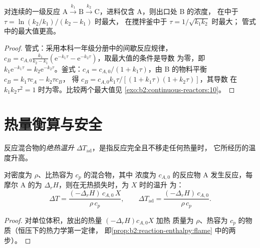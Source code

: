 \begin{proposition}[釜与管中的中间体]\label{prop:b2:continuous-reactors:consecutive}
对连续的一级反应 $\mathrm A \xrightarrow{k_1} \mathrm B
\xrightarrow{k_2} \mathrm C$，进料仅含 A，则出口处 B 的浓度，
在中于 $\tau = \ln(k_2/k_1)/(k_2 - k_1)$ 时最大，
在搅拌釜中于 $\tau = 1/\sqrt{k_1k_2}$ 时最大；
管式中的最大值更高。
\end{proposition}

\begin{proof}
管式：采用本科一年级分册中的间歇反应规律，$c_B = c_{A,0}\frac{k_1}{k_2 - k_1}
(\mathrm e^{-k_1\tau} - \mathrm e^{-k_2\tau})$，取最大值的条件是导数
为零，即 $k_1\mathrm e^{-k_1\tau} = k_2\mathrm e^{-k_2\tau}$。釜式：$c_A =
c_{A,0}/(1 + k_1\tau)$，由 B 的物料平衡 $c_B = k_1\tau c_A - k_2\tau c_B$，
得 $c_B = c_{A,0}k_1\tau/[(1 + k_1\tau)(1 + k_2\tau)]$，其导数
在 $k_1k_2\tau^2 = 1$ 时为零。比较两个最大值见
\cref{exo:b2:continuous-reactors:10}。
\end{proof}

\section{热量衡算与安全}

\begin{definition}[绝热温升]\label{def:b2:continuous-reactors:adiabatic-rise}
反应混合物的\emph{绝热温升}
$\Delta T_{\text{ad}}$，是指反应完全且不移走任何热量时，
它所经历的温度升高。
\end{definition}

\begin{proposition}[液体混合物的绝热温升]\label{prop:b2:continuous-reactors:adiabatic}
对密度为 $\rho$、比热容为 $c_p$ 的混合物，其中
浓度为 $c_{A,0}$ 的反应物 A 发生反应，每摩尔 A 的为
$\Delta_r H$，则在无热损失时，为 $X$ 时的温升
为：
\[
  \Delta T = \frac{(-\Delta_r H)\,c_{A,0}\,X}{\rho\,c_p}, \qquad
  \Delta T_{\text{ad}} = \frac{(-\Delta_r H)\,c_{A,0}}{\rho\,c_p} .
\]
\end{proposition}

\begin{proof}
对单位体积，放出的热量 $(-\Delta_r H)c_{A,0}X$ 加热
质量为 $\rho$、热容为 $c_p$ 的物质（恒压下的热力学第一定律，
即\cref{prop:b2:reaction-enthalpy:flame} 中的两步）。
\end{proof}

